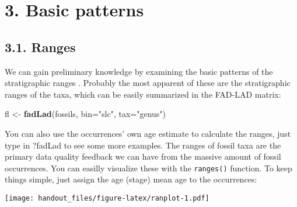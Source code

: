 \documentclass[]{article}
\newenvironment{Shaded}{\begin{snugshade}}{\end{snugshade}}
\newcommand{\DataTypeTok}[1]{\textcolor[rgb]{0.13,0.29,0.53}{#1}}
\newcommand{\DecValTok}[1]{\textcolor[rgb]{0.00,0.00,0.81}{#1}}
\newcommand{\KeywordTok}[1]{\textcolor[rgb]{0.13,0.29,0.53}{\textbf{#1}}}
\newcommand{\NormalTok}[1]{#1}
\newcommand{\OperatorTok}[1]{\textcolor[rgb]{0.81,0.36,0.00}{\textbf{#1}}}
\newcommand{\StringTok}[1]{\textcolor[rgb]{0.31,0.60,0.02}{#1}}
\begin{document}
\hypertarget{basic-patterns}{%
\section{3. Basic patterns}\label{basic-patterns}}

\hypertarget{ranges}{%
\subsection{3.1. Ranges}\label{ranges}}

We can gain preliminary knowledge by examining the basic patterns of the
stratigraphic ranges . Probably the most apparent of these are the
stratigraphic ranges of the taxa, which can be easily summarized in the
FAD-LAD matrix:

\begin{Shaded}
\begin{Highlighting}[]
\NormalTok{fl <-}\StringTok{ }\KeywordTok{fadLad}\NormalTok{(fossils, }\DataTypeTok{bin=}\StringTok{"slc"}\NormalTok{, }\DataTypeTok{tax=}\StringTok{"genus"}\NormalTok{)}
\end{Highlighting}
\end{Shaded}

You can also use the occurrences' own age estimate to calculate the
ranges, just type in ?fadLad to see some more examples. The ranges of
fossil taxa are the primary data quality feedback we can have from the
massive amount of fossil occurrences. You can easilly visualize these
with the \texttt{ranges()} function. To keep things simple, just assign
the age (stage) mean age to the occurrences:

\begin{Shaded}
\end{Shaded}

\texttt{[image: handout\_files/figure-latex/ranplot-1.pdf]}
\end{document}
